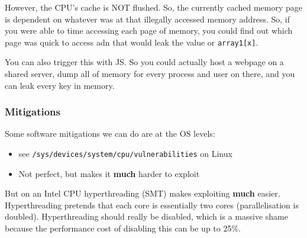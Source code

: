 \documentclass[11pt,a4paper,titlepage,dvipsnames,cmyk]{scrartcl}
\begin{document}
However, the CPU's cache is NOT flushed. So, the currently cached memory page is dependent on whatever was at that illegally accessed memory address. So, if you were able to time accessing each page of memory, you could find out which page was quick to access adn that would leak the value or \texttt{array1[x]}.

You can also trigger this with JS. So you could actually host a webpage on a shared server, dump all of memory for every process and user on there, and you can leak every key in memory.

\subsubsection{Mitigations}
Some software mitigations we can do are at the OS levels:
\begin{itemize}
    \item see \texttt{/sys/devices/system/cpu/vulnerabilities} on Linux
    \item Not perfect, but makes it \textbf{much} harder to exploit
\end{itemize}

But on an Intel CPU hyperthreading (SMT) makes exploiting \textbf{much} easier. Hyperthreading pretends that each core is essentially two cores (parallelisation is doubled). Hyperthreading should really be disabled, which is a massive shame because the performance cost of disabling this can be up to 25\%. 
\end{document}
